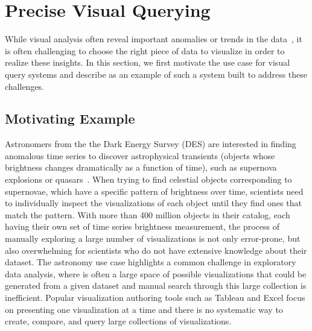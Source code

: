 \section{Precise Visual Querying\label{sec:precise}}
While visual analysis often reveal important anomalies or trends in the data~\cite{Heer2012,Morton2014}, it is often challenging to choose the right piece of data to visualize in order to realize these insights. In this section, we first motivate the use case for visual query systems and describe \zv as an example of such a system built to address these challenges.
\subsection{Motivating Example}
Astronomers from the the Dark Energy Survey (DES) are interested in finding anomalous time series to discover astrophysical transients (objects whose brightness changes dramatically as a function of time), such as supernova explosions or quasars~\cite{Drlica-Wagner2017}. When trying to find celestial objects corresponding to supernovae, which have a specific pattern of brightness over time, scientists need to individually inspect the visualizations of each object until they find ones that match the pattern. With more than 400 million objects in their catalog, each having their own set of time series brightness measurement, the process of manually exploring a large number of visualizations is not only error-prone, but also overwhelming for scientists who do not have extensive knowledge about their dataset. The astronomy use case highlights a common challenge in exploratory data analysis, where is often a large space of possible visualizations that could be generated from a given dataset and manual search through this large collection is inefficient. Popular visualization authoring tools such as Tableau and Excel focus on presenting one visualization at a time and there is no systematic way to create, compare, and query large collections of visualizations. 
